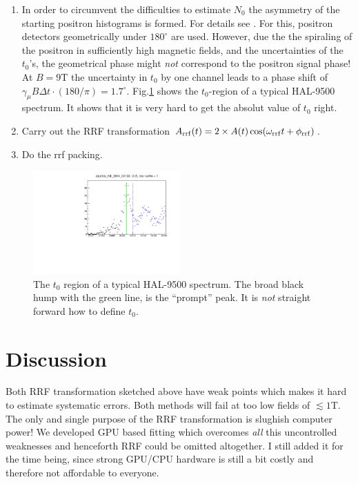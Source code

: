\documentclass[twoside]{article}
\begin{document}
\begin{enumerate}
 \item In order to circumvent the difficulties to estimate $N_0$ the asymmetry of the starting positron histograms is formed. For details 
       see \cite{musrfit_userManual15}. For this, positron detectors geometrically under $180^\circ$ are used. However, due the the spiraling
       of the positron in sufficiently high magnetic fields, and the uncertainties of the $t_0$'s, the geometrical phase might \emph{not}
       correspond to the positron signal phase! At $B=9$T the uncertainty in $t_0$ by one channel leads to a phase shift of 
       $\gamma_\mu B \Delta t \cdot (180 / \pi) = 1.7^\circ$. Fig.\ref{fig:hal-9500-t0} shows the $t_0$-region of a typical HAL-9500 spectrum.
       It shows that it is very hard to get the absolut value of $t_0$ right.
 \item Carry out the RRF transformation $A_{\rm rrf}(t) = 2 \times A(t) \cos(\omega_{\rm rrf} t + \phi_{\rm rrf})$.
 \item Do the rrf packing.
\end{enumerate}

\begin{figure}[h]
 \centering
 \includegraphics[width=0.5\textwidth]{HAL-9500-t0.pdf}
 \caption{The $t_0$ region of a typical HAL-9500 spectrum. The broad black hump with the green line, is the ``prompt'' peak.
          It is \emph{not} straight forward how to define $t_0$.}\label{fig:hal-9500-t0}
\end{figure}


\section{Discussion}

Both RRF transformation sketched above have weak points which makes it hard to estimate systematic errors. Both methods will fail at too
low fields of $\lesssim 1$T. The only and single purpose of the RRF transformation is slughish computer power! We developed GPU based fitting
which overcomes \emph{all} this uncontrolled weaknesses and henceforth RRF could be omitted altogether. I still added it for the time being,
since strong GPU/CPU hardware is still a bit costly and therefore not affordable to everyone.
\end{document}
